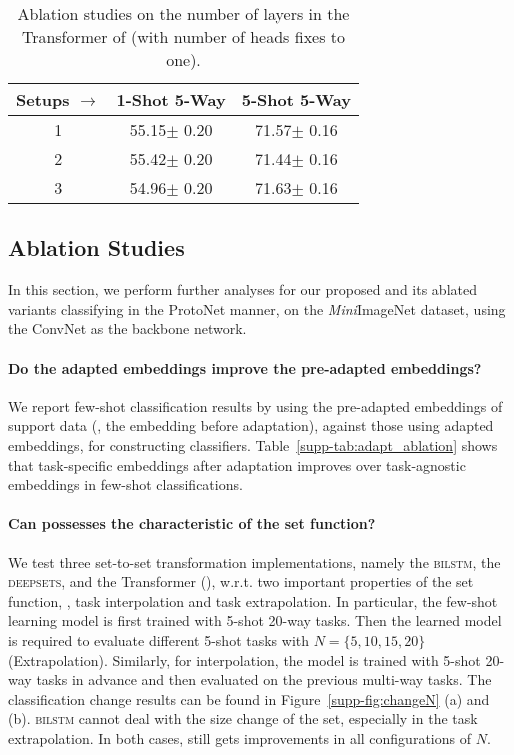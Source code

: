 \begin{table}[tbp]
	\small
	\tabcolsep 5pt
	\centering
	\caption{Ablation studies on the number of layers in the Transformer of {\feat} (with number of heads fixes to one).}
	\begin{tabular}{@{\;}ccc@{\;}}
		\addlinespace
		\toprule
		Setups $\rightarrow$ & 1-Shot 5-Way & 5-Shot 5-Way \\
		\midrule
		1     & 55.15{\tiny $\pm$ 0.20} & 71.57{\tiny $\pm$ 0.16}  \\
		2     & 55.42{\tiny $\pm$ 0.20} & 71.44{\tiny $\pm$ 0.16} \\
		3     & 54.96{\tiny $\pm$ 0.20} & 71.63{\tiny $\pm$ 0.16} \\
		\bottomrule
	\end{tabular}
	\label{supp-tab:component_layer}
\end{table}

\subsection{Ablation Studies}
\label{sec:supp-ablation}
In this section, we perform further analyses for our proposed {\feat} and its ablated variants classifying in the {ProtoNet} manner, on the {\it Mini}ImageNet dataset, using the ConvNet as the backbone network. 

\paragraph{Do the adapted embeddings improve the pre-adapted embeddings?} We report few-shot classification results by using the pre-adapted embeddings of support data (\ie, the embedding before adaptation), against those using adapted embeddings, for constructing classifiers. Table~\ref{supp-tab:adapt_ablation} shows that task-specific embeddings after adaptation improves over task-agnostic embeddings in few-shot classifications.


\paragraph{Can \feat possesses the characteristic of the set function?} We test three set-to-set transformation implementations, namely the \textsc{bilstm}, the \textsc{deepsets}, and the Transformer (\feat), w.r.t. two important properties of the set function, \ie, task interpolation and task extrapolation. In particular, the few-shot learning model is first trained with 5-shot 20-way tasks. Then the learned model is required to evaluate different 5-shot tasks with $N=\{5,10,15,20\}$ (Extrapolation). Similarly, for interpolation, the model is trained with 5-shot 20-way tasks in advance and then evaluated on the previous multi-way tasks. The classification change results can be found in Figure~\ref{supp-fig:changeN} (a) and (b). \textsc{bilstm} cannot deal with the size change of the set, especially in the task extrapolation. In both cases, {\feat} still gets improvements in all configurations of $N$. 


